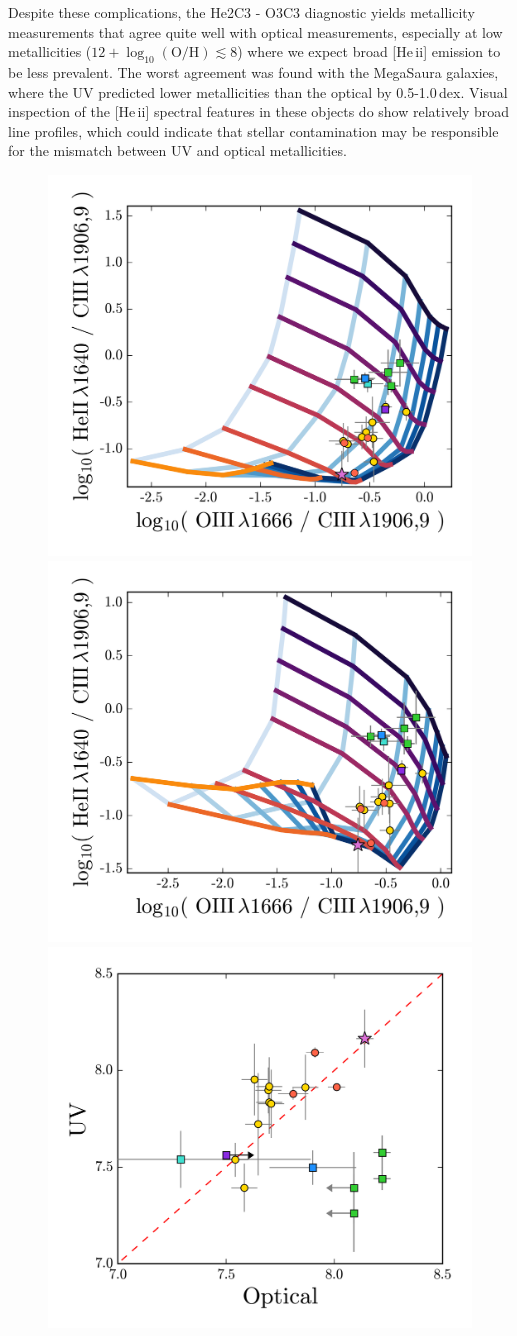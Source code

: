 \documentclass[preprint2]{aastex62}
\newcommand{\heii}{[He\,{\sc ii}]\xspace}
\newcommand{\logten}{\ensuremath{\log_{10}}}
\newcommand{\logOH}{\ensuremath{\logten (\mathrm{O}/\mathrm{H})}\xspace}
\newcommand{\mage}{{\sc Meg}a{\sc S}a{\sc ura}\xspace}
\begin{document}
Despite these complications, the He2C3 - O3C3 diagnostic yields metallicity measurements that agree quite well with optical measurements, especially at low metallicities ($12+\logOH \lesssim 8$) where we expect broad \heii emission to be less prevalent. The worst agreement was found with the \mage galaxies, where the UV predicted lower metallicities than the optical by 0.5-1.0\,dex. Visual inspection of the \heii spectral features in these objects do show relatively broad line profiles, which could indicate that stellar contamination may be responsible for the mismatch between UV and optical metallicities.
\begin{figure}
  \begin{center}
    \includegraphics[width=0.45\linewidth]{figs/f10a.png}
    \includegraphics[width=0.45\linewidth]{figs/f10b.png}
    \includegraphics[width=0.45\linewidth]{figs/f10c.png}

\end{center}
\end{figure}
\end{document}
